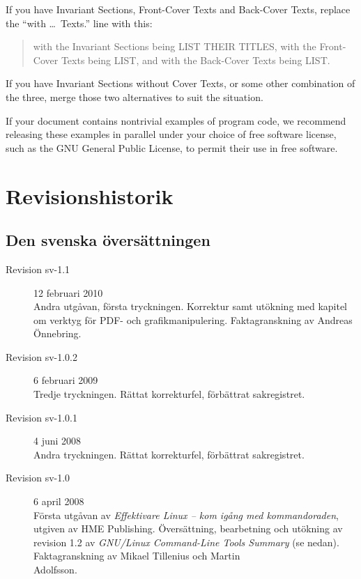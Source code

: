 \documentclass[10pt,a4paper,final]{book}
\begin{document}
{If you have Invariant Sections, Front-Cover Texts and Back-Cover Texts,
replace the ``with \dots\ Texts.'' line with this:

\begin{quote}
    with the Invariant Sections being LIST THEIR TITLES, with the
    Front-Cover Texts being LIST, and with the Back-Cover Texts being LIST.
\end{quote}
    
If you have Invariant Sections without Cover Texts, or some other
combination of the three, merge those two alternatives to suit the
situation.

If your document contains nontrivial examples of program code, we
recommend releasing these examples in parallel under your choice of
free software license, such as the GNU General Public License,
to permit their use in free software.

} %

\chapter{Revisionshistorik}\label{cha:revisioner}


\section{Den svenska översättningen}

\begin{description}

\item[Revision sv-1.1] 12 februari 2010 \\
Andra utgåvan, första tryckningen. Korrektur samt utökning med kapitel om verktyg för PDF- och grafikmanipulering. Faktagranskning av Andreas Önnebring.

\item[Revision sv-1.0.2] 6 februari 2009\\
Tredje tryckningen. Rättat korrekturfel, förbättrat sakregistret.

\item[Revision sv-1.0.1] 4 juni 2008\\
Andra tryckningen. Rättat korrekturfel, förbättrat sakregistret.

\item[Revision sv-1.0] 6 april 2008\\
Första utgåvan av \textit{Effektivare Linux -- kom igång med kommandoraden}, utgiven av HME Publishing. Översättning, bearbetning och utökning av revision 1.2 av \textit{GNU/Linux Command-Line Tools Summary} (se nedan). Faktagranskning av Mikael Tillenius och Martin \\\hbox{Adolfsson}.

\end{description}
\end{document}
